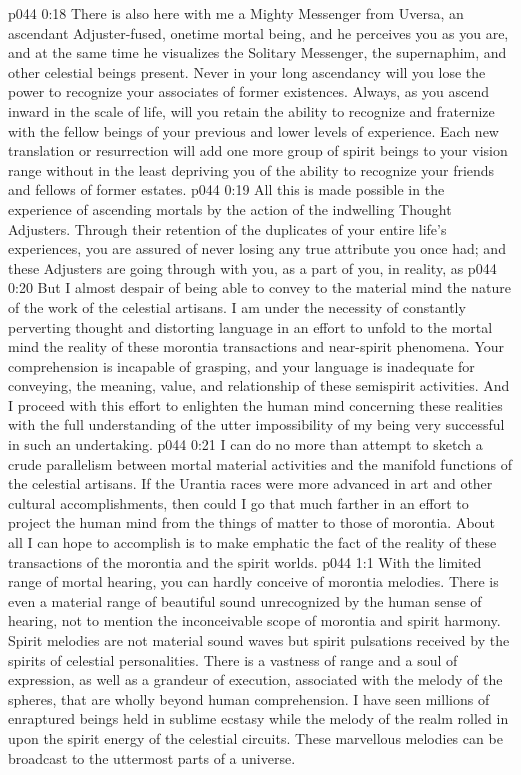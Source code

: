 \vs p044 0:18 There is also here with me a Mighty Messenger from Uversa, an ascendant Adjuster\hyp{}fused, onetime mortal being, and he perceives you as you are, and at the same time he visualizes the Solitary Messenger, the supernaphim, and other celestial beings present. Never in your long ascendancy will you lose the power to recognize your associates of former existences. Always, as you ascend inward in the scale of life, will you retain the ability to recognize and fraternize with the fellow beings of your previous and lower levels of experience. Each new translation or resurrection will add one more group of spirit beings to your vision range without in the least depriving you of the ability to recognize your friends and fellows of former estates.
\vs p044 0:19 All this is made possible in the experience of ascending mortals by the action of the indwelling Thought Adjusters. Through their retention of the duplicates of your entire life’s experiences, you are assured of never losing any true attribute you once had; and these Adjusters are going through with you, as a part of you, in reality, as 
\vs p044 0:20 But I almost despair of being able to convey to the material mind the nature of the work of the celestial artisans. I am under the necessity of constantly perverting thought and distorting language in an effort to unfold to the mortal mind the reality of these morontia transactions and near\hyp{}spirit phenomena. Your comprehension is incapable of grasping, and your language is inadequate for conveying, the meaning, value, and relationship of these semispirit activities. And I proceed with this effort to enlighten the human mind concerning these realities with the full understanding of the utter impossibility of my being very successful in such an undertaking.
\vs p044 0:21 \pc I can do no more than attempt to sketch a crude parallelism between mortal material activities and the manifold functions of the celestial artisans. If the Urantia races were more advanced in art and other cultural accomplishments, then could I go that much farther in an effort to project the human mind from the things of matter to those of morontia. About all I can hope to accomplish is to make emphatic the fact of the reality of these transactions of the morontia and the spirit worlds.
\vs p044 1:1 With the limited range of mortal hearing, you can hardly conceive of morontia melodies. There is even a material range of beautiful sound unrecognized by the human sense of hearing, not to mention the inconceivable scope of morontia and spirit harmony. Spirit melodies are not material sound waves but spirit pulsations received by the spirits of celestial personalities. There is a vastness of range and a soul of expression, as well as a grandeur of execution, associated with the melody of the spheres, that are wholly beyond human comprehension. I have seen millions of enraptured beings held in sublime ecstasy while the melody of the realm rolled in upon the spirit energy of the celestial circuits. These marvellous melodies can be broadcast to the uttermost parts of a universe.

